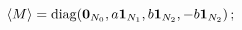 \begin{equation}\label{Mmatrixvevs}
  \langle M \rangle = \mathrm{diag}({\bf 0}_{N_0},
  a {\bf 1}_{N_1}, b {\bf 1}_{N_2}, -b {\bf 1}_{N_2})\,;
\end{equation}

